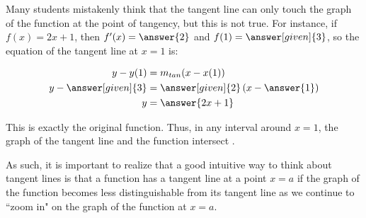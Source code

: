\documentclass[nooutcomes]{ximera}
\begin{document}
\begin{warning}
Many students mistakenly think that the tangent line can only touch the graph of the function at the point of tangency, but this is not true.  For instance, if $f(x) = 2x+1$, then $f'(x) = \answer{2}$ and $f(1) = \answer[given]{3}$, so the equation of the tangent line at $x=1$ is:

\begin{align*}
y-y(1) &= m_{tan}(x-x(1)) \\
y - \answer[given]{3} &= \answer[given]{2}\left(x-\answer{1}\right) \\
y &= \answer{2x+1}
\end{align*}

This is exactly the original function.  Thus, in any interval around $x=1$, the graph of the tangent line and the function intersect .

As such, it is important to realize that a good intuitive way to think about tangent lines is that a function has a tangent line at a point $x=a$ if the graph of the function becomes less distinguishable from its tangent line as we continue to ``zoom in" on the graph of the function at $x=a$.
\end{warning}
\end{document}
